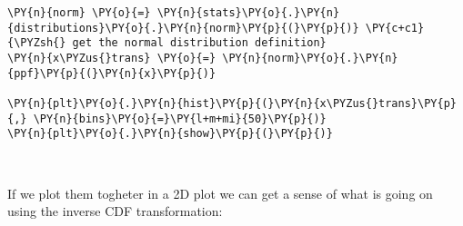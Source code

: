     \begin{tcolorbox}[breakable, size=fbox, boxrule=1pt, pad at break*=1mm,colback=cellbackground, colframe=cellborder]
\begin{Verbatim}[commandchars=\\\{\}]
\PY{n}{norm} \PY{o}{=} \PY{n}{stats}\PY{o}{.}\PY{n}{distributions}\PY{o}{.}\PY{n}{norm}\PY{p}{(}\PY{p}{)} \PY{c+c1}{\PYZsh{} get the normal distribution definition}
\PY{n}{x\PYZus{}trans} \PY{o}{=} \PY{n}{norm}\PY{o}{.}\PY{n}{ppf}\PY{p}{(}\PY{n}{x}\PY{p}{)}

\PY{n}{plt}\PY{o}{.}\PY{n}{hist}\PY{p}{(}\PY{n}{x\PYZus{}trans}\PY{p}{,} \PY{n}{bins}\PY{o}{=}\PY{l+m+mi}{50}\PY{p}{)}
\PY{n}{plt}\PY{o}{.}\PY{n}{show}\PY{p}{(}\PY{p}{)}
\end{Verbatim}
\end{tcolorbox}

    \begin{center}
    \end{center}
    { \hspace*{\fill} \\}
    
    If we plot them togheter in a 2D plot we can get a sense of what is
going on using the inverse CDF transformation:

